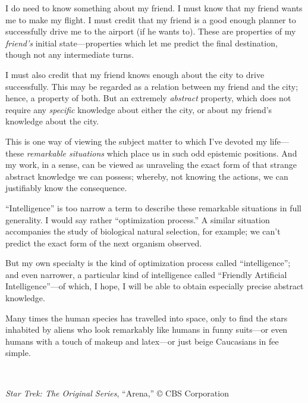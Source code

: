 {
 I do need to know something about my friend. I must know that my
friend wants me to make my flight. I must credit that my friend is a
good enough planner to successfully drive me to the airport (if he
wants to). These are properties of my \textit{friend's}
initial state---properties which let me predict the final destination,
though not any intermediate turns.}

{
 I must also credit that my friend knows enough about the city to
drive successfully. This may be regarded as a relation between my
friend and the city; hence, a property of both. But an extremely
\textit{abstract} property, which does not require any
\textit{specific} knowledge about either the city, or about my
friend's knowledge about the city.}

{
 This is one way of viewing the subject matter to which
I've devoted my life---these \textit{remarkable
situations} which place us in such odd epistemic positions. And my
work, in a sense, can be viewed as unraveling the exact form of that
strange abstract knowledge we can possess; whereby, not knowing the
actions, we can justifiably know the consequence.}

{
 ``Intelligence'' is too narrow
a term to describe these remarkable situations in full generality. I
would say rather ``optimization
process.'' A similar situation accompanies the study
of biological natural selection, for example; we can't
predict the exact form of the next organism observed.}

{
 But my own specialty is the kind of optimization process called
``intelligence''; and even narrower,
a particular kind of intelligence called ``Friendly
Artificial Intelligence''---of which, I hope, I will
be able to obtain especially precise abstract knowledge.}

\myendsectiontext


{
 Many times the human species has travelled into space, only to
find the stars inhabited by aliens who look remarkably like humans in
funny suits---or even humans with a touch of makeup and latex---or just
beige Caucasians in fee simple.}

{
 ~}

{\centering
{}
 \newline
 \textit{Star Trek: The Original Series},
``Arena,'' © CBS Corporation
\par}


